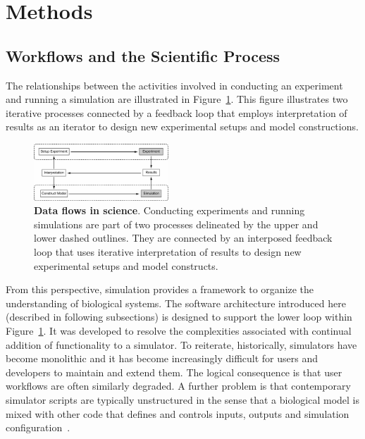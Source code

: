 \documentclass[11pt,3p,twocolumn]{JMN}
\begin{document}


\section{Methods}

\subsection{Workflows and the Scientific Process}

The relationships between the activities involved in conducting an experiment and running a simulation are illustrated in Figure~\ref{fig:exp-sim}. This figure illustrates two iterative processes connected by a feedback loop that employs interpretation of results as an iterator to design new experimental setups and model constructions.

\begin{figure}[h!t]
  \begin{center}
    \includegraphics[width=0.45\textwidth]{figures/exp-sim.pdf}
  \end{center}
  \caption{ \small{\textbf{Data flows in science}. Conducting experiments and running simulations are part of two processes delineated by the upper and lower dashed outlines. They are connected by an interposed feedback loop that uses iterative interpretation of results to design new experimental setups and model constructs.}}
    \label{fig:exp-sim}
\end{figure}

From this perspective, simulation provides a framework to organize the understanding of biological systems. The software architecture introduced here (described in following subsections) is designed to support the lower loop within Figure~\ref{fig:exp-sim}. It was developed to resolve the complexities associated with continual addition of functionality to a simulator. To reiterate, historically, simulators have become monolithic and it has become increasingly difficult for users and developers to maintain and extend them. The logical consequence is that user workflows are often similarly degraded. A further problem is that contemporary simulator scripts are typically unstructured in the sense that a biological model is mixed with other code that defines and controls inputs, outputs and simulation configuration~\citep{cannon07:_inter}.
\end{document}
